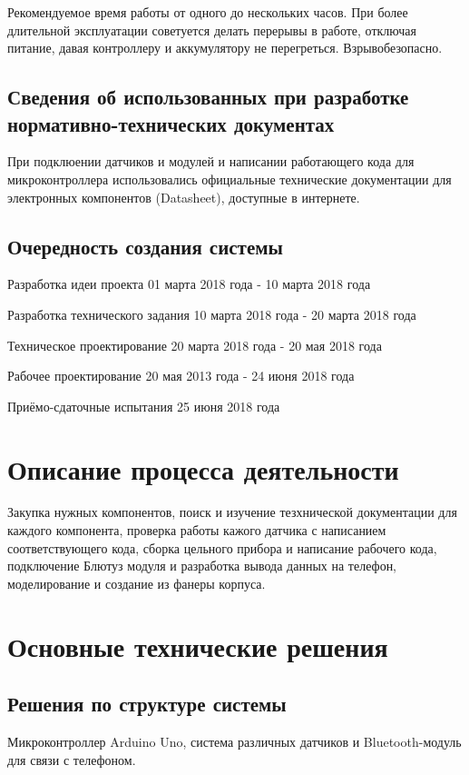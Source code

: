 \documentclass[12pt,a4paper]{scrartcl}
\begin{document}
 	Рекомендуемое время работы от одного до нескольких часов. При более длительной эксплуатации советуется делать перерывы в работе, отключая питание, давая контроллеру и аккумулятору не перегреться. Взрывобезопасно.
 	
 		\subsection{Сведения об использованных при разработке нормативно-технических документах }
 	При подклюении датчиков и модулей и написании работающего кода для микроконтроллера использовались официальные технические документации для электронных компонентов (Datasheet), доступные в интернете.
 	
 		\subsection{Очередность создания системы}
 	Разработка идеи проекта 01 марта 2018 года - 10 марта 2018 года
 	
 	Разработка технического задания 10 марта 2018 года - 20 марта 2018 года
 	
 	Техническое проектирование 20 марта 2018 года - 20 мая 2018 года
 	
 	Рабочее проектирование 20 мая 2013 года - 24 июня 2018 года
 	
 	Приёмо-сдаточные испытания  25 июня 2018 года
 	
 	\section{Описание процесса деятельности}
 	Закупка нужных компонентов, поиск и изучение тезхнической документации для каждого компонента, проверка работы кажого датчика с написанием соответствующего кода, сборка цельного прибора и написание рабочего кода, подключение Блютуз модуля и разработка вывода данных на телефон, моделирование и создание из фанеры корпуса. 
 	
 	\section{Основные технические решения}
 		\subsection{Решения по структуре системы }
 	Микроконтроллер Arduino Uno, система различных датчиков и Bluetooth-модуль для связи с телефоном.	
 	
\end{document}
